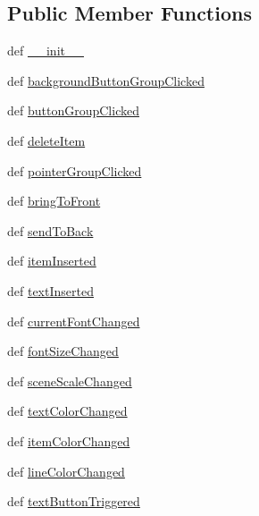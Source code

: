 \subsection*{Public Member Functions}
\begin{DoxyCompactItemize}
\item 
def \hyperlink{classdiagramscene_1_1MainWindow_a49051a94ef4966f7a64bb6051211c9bd}{\+\_\+\+\_\+init\+\_\+\+\_\+}
\item 
def \hyperlink{classdiagramscene_1_1MainWindow_ae70f511ce7593d6dd7e6b1e6f419818f}{background\+Button\+Group\+Clicked}
\item 
def \hyperlink{classdiagramscene_1_1MainWindow_a0dd8be628269976989b23c5a4c1f23db}{button\+Group\+Clicked}
\item 
def \hyperlink{classdiagramscene_1_1MainWindow_a0943e7d56f63e9bc386912025a88793b}{delete\+Item}
\item 
def \hyperlink{classdiagramscene_1_1MainWindow_a898c9ecdd83c082e787332d000d5bf34}{pointer\+Group\+Clicked}
\item 
def \hyperlink{classdiagramscene_1_1MainWindow_a8f911816c0d3daaccdc1d8c715d41ed8}{bring\+To\+Front}
\item 
def \hyperlink{classdiagramscene_1_1MainWindow_ad6c97b036015011a1596ec7467c2bb84}{send\+To\+Back}
\item 
def \hyperlink{classdiagramscene_1_1MainWindow_a99b60ed26c305958e872ede0fe603894}{item\+Inserted}
\item 
def \hyperlink{classdiagramscene_1_1MainWindow_ac3c0e64f601e6b08a0db558a538e9312}{text\+Inserted}
\item 
def \hyperlink{classdiagramscene_1_1MainWindow_a2cfd1fc90ffce7edc40821ea3e62ba98}{current\+Font\+Changed}
\item 
def \hyperlink{classdiagramscene_1_1MainWindow_a777cbfdc0bff6036ed0f6788023a5f06}{font\+Size\+Changed}
\item 
def \hyperlink{classdiagramscene_1_1MainWindow_afdd6255e46696658e54e76ebaa114f4a}{scene\+Scale\+Changed}
\item 
def \hyperlink{classdiagramscene_1_1MainWindow_a9c7900f1be75943e7b129b7e351dfe2b}{text\+Color\+Changed}
\item 
def \hyperlink{classdiagramscene_1_1MainWindow_a4a354a327879d140c736782e3134ace0}{item\+Color\+Changed}
\item 
def \hyperlink{classdiagramscene_1_1MainWindow_a05c5d191f293c3105823b448a8fe17de}{line\+Color\+Changed}
\item 
def \hyperlink{classdiagramscene_1_1MainWindow_a32ce74c74c673e4314b47357d81e9d6d}{text\+Button\+Triggered}

\end{DoxyCompactItemize}
